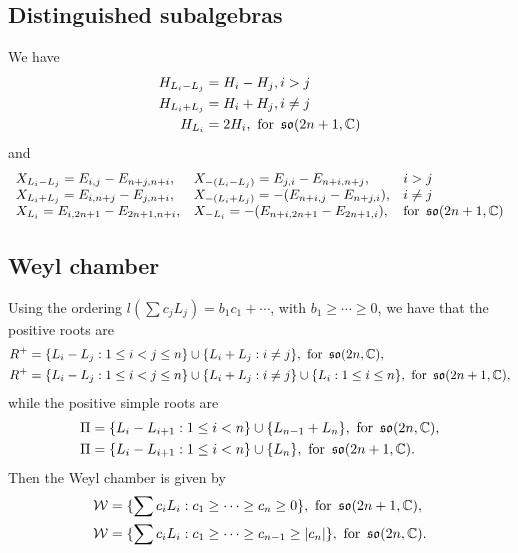 \documentclass{report}
\begin{document}
\subsection{Distinguished subalgebras}
We have
\begin{align*}
    H_{L_i - L_j} &= H_i - H_j, i > j\\
    H_{L_i + L_j} &= H_i + H_j, i \neq j\\
    H_{L_i} &= 2H_i, \text{ for } \operatorname{{\mathfrak{so}}}(2n+1, \mathbb C)
\end{align*}
and
\[
\begin{array}{lll}
    X_{L_i - L_j} = E_{i,j} - E_{n+j, n+i}, & X_{-(L_i - L_j)} = E_{j,i} - E_{n+i, n+j}, & i > j\\
    X_{L_i + L_j} = E_{i, n+j} - E_{j, n+i}, & X_{-(L_i + L_j)} = - (E_{n+i, j} - E_{n+j, i}), & i \neq j\\
    X_{L_i} = E_{i, 2n+1} - E_{2n+1, n+i}, & X_{-L_i} = -(E_{n + i, 2n+1} - E_{2n+1, i}), & \text{for } \operatorname{{\mathfrak{so}}}(2n+1, \mathbb C)
\end{array}
\]

\subsection{Weyl chamber}
Using the ordering $l(\sum c_j L_j) = b_1 c_1 + \cdots$, with $b_1\geq \cdots \geq 0$, we have that the positive roots are
\begin{align*}
    R^+ &= \{ L_i - L_j : 1 \leq i < j \leq n \} \cup \{ L_i + L_j : i \neq j \}, \text{ for } \operatorname{{\mathfrak{so}}}(2n, \mathbb C),\\
    R^+ &= \{ L_i - L_j : 1 \leq i < j \leq n \} \cup \{ L_i + L_j : i \neq j \} \cup \{ L_i : 1 \leq i \leq n \}, \text{ for } \operatorname{{\mathfrak{so}}}(2n+1, \mathbb C),
\end{align*}
while the positive simple roots are
\begin{align*}
    \Pi &= \{ L_i - L_{i+1} : 1 \leq i < n \} \cup \{L_{n-1} + L_n\}, \text{ for } \operatorname{{\mathfrak{so}}}(2n, \mathbb C),\\
    \Pi &= \{ L_i - L_{i+1} : 1 \leq i < n \} \cup \{L_n \}, \text{ for } \operatorname{{\mathfrak{so}}}(2n+1, \mathbb C).
\end{align*}
Then the Weyl chamber is given by
\begin{align*}
    \mathcal W &= \{ \sum c_i L_i : c_1 \geq \cdots \geq c_n \geq 0 \}, \text{ for } \operatorname{{\mathfrak{so}}}(2n+1, \mathbb C),\\
    \mathcal W &= \{ \sum c_i L_i : c_1 \geq \cdots \geq c_{n-1} \geq |c_n| \}, \text{ for } \operatorname{{\mathfrak{so}}}(2n, \mathbb C).
\end{align*}
\end{document}

